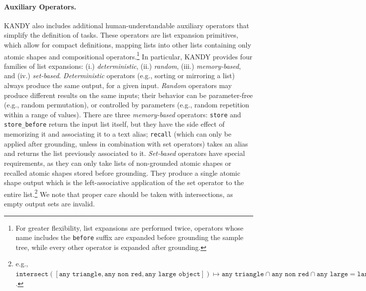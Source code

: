 \paragraph{Auxiliary Operators.}
\textsc{KANDY} also includes additional human-understandable auxiliary operators that simplify the definition of tasks.
%
These operators are list expansion primitives, which allow for compact definitions, mapping lists into other lists containing only atomic shapes and compositional operators.\footnote{For greater flexibility, list expansions are performed twice, operators whose name includes the \texttt{before} suffix are expanded before grounding the sample tree, while every other operator is expanded after grounding.}
%
In particular, KANDY provides four families of list expansions: (i.) \textit{deterministic}, (ii.) \textit{random}, (iii.) \textit{memory-based}, and (iv.) \textit{set-based}. %
%
\textit{Deterministic} operators (e.g., sorting or mirroring a list) always produce the same output, for a given input. %
%
\textit{Random} operators may produce different results on the same inputs; their behavior can be parameter-free (e.g., random permutation), or controlled by parameters (e.g., random repetition within a range of values).
%
There are three \textit{memory-based} operators: \texttt{store} and \texttt{store\_before} return the input list itself, but they have the side effect of memorizing it and associating it to a text alias; \texttt{recall} (which can only be applied after grounding, unless in combination with set operators) takes an alias and returns the list previously associated to it.
%
\textit{Set-based} operators have special requirements, as they can only take lists of non-grounded atomic shapes or recalled atomic shapes stored before grounding. They produce a single atomic shape output which is the left-associative application of the set operator to the entire list.\footnote{e.g., $\texttt{intersect}([\texttt{any triangle}, \texttt{any non red}, \texttt{any large object}]) \mapsto \texttt{any triangle} \cap \texttt{any non red} \cap \texttt{any large} = \texttt{large non red triangle}$.} We note that proper care should be taken with intersections, as empty output sets are invalid.

